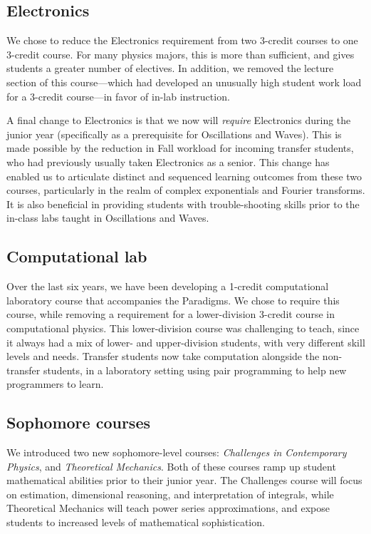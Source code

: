 \documentclass[english,aps,pra,reprint,noshowpacs,superscriptaddress]{revtex4-1}
\begin{document}
\subsection{Electronics}
We chose to reduce the Electronics requirement from two 3-credit
courses to one 3-credit course.  For many physics majors, this is more
than sufficient, and gives students a greater number of electives.  In
addition, we removed the lecture section of this course---which had
developed an unusually high student work load for a 3-credit
course---in favor of in-lab instruction.

A final change to Electronics is that we now will \emph{require}
Electronics during the junior year (specifically as a prerequisite for
Oscillations and Waves).  This is made possible by the reduction in
Fall workload for incoming transfer students, who had previously
usually taken Electronics as a senior.  This change has enabled us to
articulate distinct and sequenced learning outcomes from these two
courses, particularly in the realm of complex exponentials and Fourier
transforms.  It is also beneficial in providing students with
trouble-shooting skills prior to the in-class labs taught in
Oscillations and Waves.

\subsection{Computational lab}
Over the last six years, we have been developing a 1-credit
computational laboratory course that accompanies the Paradigms.  We
chose to require this course, while removing a requirement for a
lower-division 3-credit course in computational physics.  This
lower-division course was challenging to teach, since it always had a
mix of lower- and upper-division students, with very different skill
levels and needs.  Transfer students now take computation alongside
the non-transfer students, in a laboratory setting using pair
programming to help new programmers to learn.

\subsection{Sophomore courses}
We introduced two new sophomore-level courses: \emph{Challenges in
  Contemporary Physics}, and \emph{Theoretical Mechanics}.  Both of
these courses ramp up student mathematical abilities prior to their
junior year.  The Challenges course will focus on estimation,
dimensional reasoning, and interpretation of integrals, while
Theoretical Mechanics will teach power series approximations, and
expose students to increased levels of mathematical sophistication.
\end{document}
